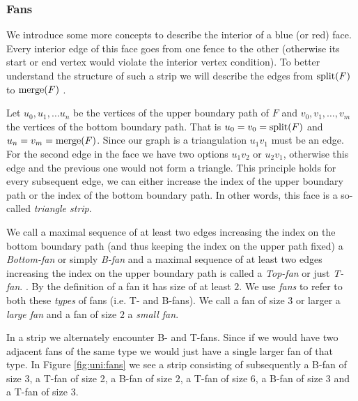    \subsubsection{Fans}
    We introduce some more concepts to describe the interior of a blue (or red) face. Every interior edge of this face goes from one fence to the other (otherwise its start or end vertex would violate the interior vertex condition). To better understand the structure of such a strip we will describe the edges from $\operatorname{split}(F)$ to $\operatorname{merge}(F)$ .

    Let $u_0 , u_1, \ldots u_n$ be the vertices of the upper boundary path of $F$ and $v_0, v_1, \ldots, v_m$ the vertices of the bottom boundary path. That is $u_0=v_0 = \operatorname{split}(F)$ and $u_n = v_m = \operatorname{merge}(F)$. Since our graph is a triangulation $u_1v_1$ must be an edge. For the second edge in the face we have two options $u_1v_2$ or $u_2v_1$, otherwise this edge and the previous one would not form a triangle. This principle holds for every subsequent edge, we can either increase the index of the upper boundary path or the index of the bottom boundary path. In other words, this face is a so-called \emph{triangle strip}.

    We call a maximal sequence of at least two edges increasing the index on the bottom boundary path (and thus keeping the index on the upper path fixed) a \emph{Bottom-fan} or simply \emph{B-fan} and a maximal sequence of at least two edges increasing the index on the upper boundary path is called a \emph{Top-fan} or just \emph{T-fan}. . By the definition of a fan it has size of at least $2$.
    We use \emph{fans} to refer to both these \emph{types} of fans (i.e. T- and B-fans).
    We call a fan of size $3$ or larger a \emph{large fan} and a fan of size $2$ a \emph{small fan}.

    In a strip we alternately encounter B- and T-fans. Since if we would have two adjacent fans of the same type we would just have a single larger fan of that type.
    In Figure \ref{fig:uni:fans} we see a strip consisting of subsequently a B-fan of size $3$, a T-fan of size 2, a B-fan of size $2$, a T-fan of size $6$, a B-fan of size $3$ and a T-fan of size $3$.

